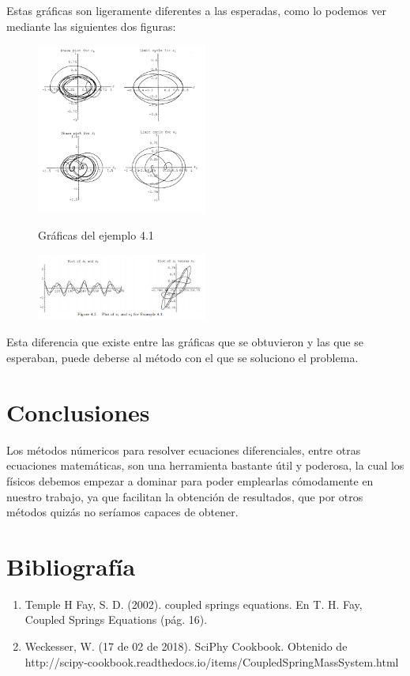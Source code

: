 \documentclass{article}
\begin{document}
Estas gráficas son ligeramente diferentes a las esperadas, como lo podemos ver mediante las siguientes dos figuras:
\begin{figure}[H]
    \caption{Gráficas del ejemplo 4.1}
    \includegraphics[width=0.5\textwidth]{Ejemplo8.PNG}
    \centering
    \label{Cod}
\end{figure}
\begin{figure}[H]
    \includegraphics[width=0.5\textwidth]{Ejemplo8-1.PNG}
    \centering
    \label{Cod}
\end{figure}
Esta diferencia que existe entre las gráficas que se obtuvieron y las que se esperaban, puede deberse al método con el que se soluciono el problema.

\section{Conclusiones}
Los métodos númericos para resolver ecuaciones diferenciales, entre otras ecuaciones matemáticas, son una herramienta bastante útil y poderosa, la cual los físicos debemos empezar a dominar para poder emplearlas cómodamente en nuestro trabajo, ya que facilitan la obtención de resultados, que por otros métodos quizás no seríamos capaces de obtener.

\section{Bibliografía}
\begin{enumerate}
\item Temple H Fay, S. D. (2002). coupled springs equations. En T. H. Fay, Coupled Springs Equations (pág. 16).
\item Weckesser, W. (17 de 02 de 2018). SciPhy Cookbook. Obtenido de http://scipy-cookbook.readthedocs.io/items/CoupledSpringMassSystem.html
\end {enumerate}
\end{document}
